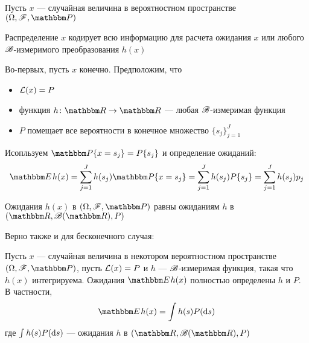 \begin{frame}

    \vspace{2em}
   Пусть $x$ --- случайная величина в вероятностном пространстве $(\Omega, \fF, \PP)$
   
   Распределение $x$ кодирует всю информацию для расчета 
   ожидания $x$ или любого $\mathscr B$-измеримого преобразования $h(x)$
   
   Во-первых, пусть $x$ конечно. Предположим, что 
   
   \begin{itemize}
       \item  $\mathcal L(x) = P$
       \item  функция $h\colon \RR \to \RR$ --- любая $\mathscr B$-измеримая функция
       \item $P$ помещает все вероятности в конечное множество $\{s_j\}_{j=1}^J$
   \end{itemize}
   
   \vspace{.7em}
   Исопльзуем $\PP\{x = s_j\} = P\{s_j\}$ и определение ожиданий:
    \begin{equation*}
        \label{eq:ehx}
        \EE h(x) 
        = \sum_{j=1}^J h(s_j) \PP\{x = s_j\}
        = \sum_{j=1}^J h(s_j) P\{s_j\}
        = \sum_{j=1}^J h(s_j) p_j
    \end{equation*}

\end{frame}

\begin{frame}
       
    \vspace{2em}
   Ожидания $h(x)$ в $(\Omega, \fF, \PP)$ равны
   ожиданиям $h$ в $(\RR, \bB(\RR), P)$
   
   Верно также и для бесконечного случая:
   
   \vspace{1em}
   \Fact
    Пусть $x$ --- случайная величина в некотором вероятностном пространстве $(\Omega, \fF,
    \PP)$, пусть $\mathcal L(x) = P$ и $h$ --- $\mathscr B$-измеримая функция, такая
    что $h(x)$ интегрируема. Ожидания $\EE h(x)$ полностью
    определены $h$ и $P$. В частности,
    \begin{equation*}
        \EE h(x) = \int h(s) P(\diff s)
    \end{equation*}
    где $\int h(s) P(\mathop{}\!\mathrm{d} s)$ --- ожидания $h$ в $(\RR, \bB(\RR), P)$

\end{frame}

